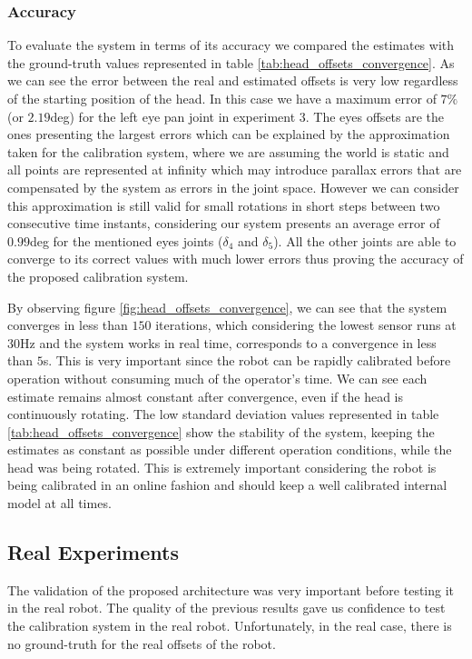 \subsubsection{Accuracy}

To evaluate the system in terms of its accuracy we compared the estimates with the ground-truth values represented in table \ref{tab:head_offsets_convergence}. As we can see the error between the real and estimated offsets is very low regardless of the starting position of the head. In this case we have a maximum error of $7\%$ (or $2.19$deg) for the left eye pan joint in experiment $3$. The eyes offsets are the ones presenting the largest errors which can be explained by the approximation taken for the calibration system, where we are assuming the world is static and all points are represented at infinity which may introduce parallax errors that are compensated by the system as errors in the joint space. However we can consider this approximation is still valid for small rotations in short steps between two consecutive time instants, considering our system presents an average error of $0.99$deg for the mentioned eyes joints ($\delta_4$ and $\delta_5$). All the other joints are able to converge to its correct values with much lower errors thus proving the accuracy of the proposed calibration system. 

By observing figure \ref{fig:head_offsets_convergence}, we can see that the system converges in less than $150$ iterations, which considering the lowest sensor runs at $30$Hz and the system works in real time, corresponds to a convergence in less than $5$s. This is very important since the robot can be rapidly calibrated before operation without consuming much of the operator's time. We can see each estimate remains almost constant after convergence, even if the head is continuously rotating. The low standard deviation values represented in table \ref{tab:head_offsets_convergence} show the stability of the system, keeping the estimates as constant as possible under different operation conditions, while the head was being rotated. This is extremely important considering the robot is being calibrated in an online fashion and should keep a well calibrated internal model at all times. 

\subsection{Real Experiments}\label{sec:real_experiments}

The validation of the proposed architecture was very important before testing it in the real robot. The quality of the previous results gave us confidence to test the calibration system in the real robot. Unfortunately, in the real case, there is no ground-truth for the real offsets of the robot. 

